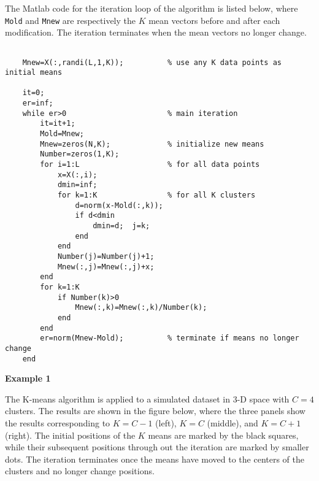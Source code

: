 \documentclass{article}
\begin{document}
The Matlab code for the iteration loop of the algorithm is listed below,
where \verb|Mold| and \verb|Mnew| are respectively the $K$ mean vectors 
before and after each modification. The iteration terminates when the
mean vectors no longer change.

\begin{verbatim}

    Mnew=X(:,randi(L,1,K));          % use any K data points as initial means

    it=0;
    er=inf;
    while er>0                       % main iteration
        it=it+1;
        Mold=Mnew;
        Mnew=zeros(N,K);             % initialize new means
        Number=zeros(1,K);     
        for i=1:L                    % for all data points 
            x=X(:,i);
            dmin=inf;
            for k=1:K                % for all K clusters
                d=norm(x-Mold(:,k));
                if d<dmin
                    dmin=d;  j=k;
                end
            end
            Number(j)=Number(j)+1;
            Mnew(:,j)=Mnew(:,j)+x;
        end 
        for k=1:K
            if Number(k)>0
                Mnew(:,k)=Mnew(:,k)/Number(k);
            end
        end
        er=norm(Mnew-Mold);          % terminate if means no longer change
    end

\end{verbatim}

{\bf Example 1} 

The K-means algorithm is applied to a simulated dataset in 3-D space with 
$C=4$ clusters. The results are shown in the figure below, where the three 
panels show the results corresponding to $K=C-1$ (left), $K=C$ (middle), 
and $K=C+1$ (right). The initial positions of the $K$ means are marked 
by the black squares, while their subsequent positions through out the 
iteration are marked by smaller dots. The iteration terminates once the
means have moved to the centers of the clusters and no longer change 
positions. 

\end{document}

